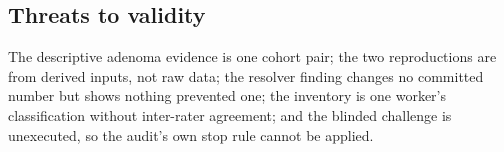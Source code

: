 \subsection{Threats to validity}
The descriptive adenoma evidence is one cohort pair; the two reproductions are
from derived inputs, not raw data; the resolver finding changes no committed
number but shows nothing prevented one; the inventory is one worker's
classification without inter-rater agreement; and the blinded challenge is
unexecuted, so the audit's own stop rule cannot be applied.
